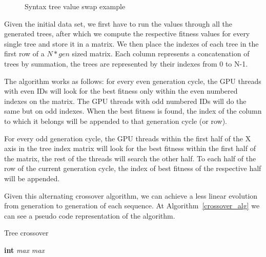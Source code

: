 \documentclass[runningheads]{llncs}
\begin{document}
\begin{figure}
\hfil
{}
\hfil
\caption{Syntax tree value swap example}
\label{syntree}
\end{figure}

Given the initial data set, we first have to run the values through all the generated trees, after which we compute the respective fitness values for every single tree and store it in a matrix. We then place the indexes of each tree in the first row of a $N * gen$ sized matrix. Each column represents a concatenation of trees by summation, the trees are represented by their indexes from 0 to N-1.

The algorithm works as follows: for every even generation cycle, the GPU threads with even IDs will look for the best fitness only within the even numbered indexes on the matrix. The GPU threads with odd numbered IDs will do the same but on odd indexes. When the best fitness is found, the index of the column to which it belongs will be appended to that generation cycle (or row).

For every odd generation cycle, the GPU threads within the first half of the X axis in the tree index matrix will look for the best fitness within the first half of the matrix, the rest of the threads will search the other half. To each half of the row of the current generation cycle, the index of best fitness of the respective half will be appended.

Given this alternating crossover algorithm, we can achieve a less linear evolution from generation to generation of each sequence. At Algorithm~\ref{crossover_alg} we can see a pseudo code representation of the algorithm.

\begin{algorithm}
\caption{Tree crossover}
\begin{algorithmic}[1]
\State \textbf{int} \textit{max}
	\EndFor
\Else {}
	\EndFor
\Else
	\EndFor
\EndIf
\EndIf
\State \Return \textit{max}
\EndProcedure
\end{algorithmic}
\label{crossover_alg}
\end{algorithm}
\end{document}
